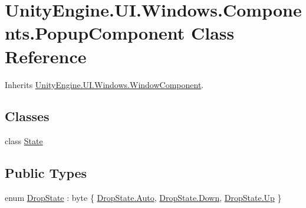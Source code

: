 \hypertarget{class_unity_engine_1_1_u_i_1_1_windows_1_1_components_1_1_popup_component}{}\section{Unity\+Engine.\+U\+I.\+Windows.\+Components.\+Popup\+Component Class Reference}
\label{class_unity_engine_1_1_u_i_1_1_windows_1_1_components_1_1_popup_component}


Inherits \hyperlink{class_unity_engine_1_1_u_i_1_1_windows_1_1_window_component}{Unity\+Engine.\+U\+I.\+Windows.\+Window\+Component}.

\subsection*{Classes}
\begin{DoxyCompactItemize}
\item 
class \hyperlink{class_unity_engine_1_1_u_i_1_1_windows_1_1_components_1_1_popup_component_1_1_state}{State}
\end{DoxyCompactItemize}
\subsection*{Public Types}
\begin{DoxyCompactItemize}
\item 
enum \hyperlink{class_unity_engine_1_1_u_i_1_1_windows_1_1_components_1_1_popup_component_a0cdf218950a065b27ae22c809f6bfb06}{Drop\+State} \+: byte \{ \hyperlink{class_unity_engine_1_1_u_i_1_1_windows_1_1_components_1_1_popup_component_a0cdf218950a065b27ae22c809f6bfb06a06b9281e396db002010bde1de57262eb}{Drop\+State.\+Auto}, 
\hyperlink{class_unity_engine_1_1_u_i_1_1_windows_1_1_components_1_1_popup_component_a0cdf218950a065b27ae22c809f6bfb06a08a38277b0309070706f6652eeae9a53}{Drop\+State.\+Down}, 
\hyperlink{class_unity_engine_1_1_u_i_1_1_windows_1_1_components_1_1_popup_component_a0cdf218950a065b27ae22c809f6bfb06a258f49887ef8d14ac268c92b02503aaa}{Drop\+State.\+Up}
 \}
\end{DoxyCompactItemize}
